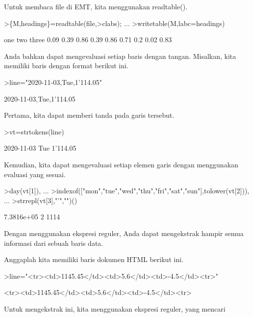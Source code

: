 \documentclass{article}
\begin{document}
\begin{eulernotebook}
\begin{eulercomment}
Untuk membaca file di EMT, kita menggunakan readtable().
\end{eulercomment}
\begin{eulerprompt}
>\{M,headings\}=readtable(file,>clabs); ...
>writetable(M,labc=headings)
\end{eulerprompt}
\begin{euleroutput}
         one       two     three
        0.09      0.39      0.86
        0.39      0.86      0.71
         0.2      0.02      0.83
\end{euleroutput}
\begin{eulercomment}
Anda bahkan dapat mengevaluasi setiap baris dengan tangan. Misalkan,
kita memiliki baris dengan format berikut ini.
\end{eulercomment}
\begin{eulerprompt}
>line="2020-11-03,Tue,1'114.05"
\end{eulerprompt}
\begin{euleroutput}
  2020-11-03,Tue,1'114.05
\end{euleroutput}
\begin{eulercomment}
Pertama, kita dapat memberi tanda pada garis tersebut.
\end{eulercomment}
\begin{eulerprompt}
>vt=strtokens(line)
\end{eulerprompt}
\begin{euleroutput}
  2020-11-03
  Tue
  1'114.05
\end{euleroutput}
\begin{eulercomment}
Kemudian, kita dapat mengevaluasi setiap elemen garis dengan
menggunakan evaluasi yang sesuai.
\end{eulercomment}
\begin{eulerprompt}
>day(vt[1]),  ...
>indexof(["mon","tue","wed","thu","fri","sat","sun"],tolower(vt[2])),  ...
>strrepl(vt[3],"'","")()
\end{eulerprompt}
\begin{euleroutput}
  7.3816e+05
  2
  1114
\end{euleroutput}
\begin{eulercomment}
Dengan menggunakan ekspresi reguler, Anda dapat mengekstrak hampir
semua informasi dari sebuah baris data.

Anggaplah kita memiliki baris dokumen HTML berikut ini.
\end{eulercomment}
\begin{eulerprompt}
>line="<tr><td>1145.45</td><td>5.6</td><td>-4.5</td><tr>"
\end{eulerprompt}
\begin{euleroutput}
  <tr><td>1145.45</td><td>5.6</td><td>-4.5</td><tr>
\end{euleroutput}
\begin{eulercomment}
Untuk mengekstrak ini, kita menggunakan ekspresi reguler, yang mencari



\end{eulercomment}
\end{eulernotebook}
\end{document}
